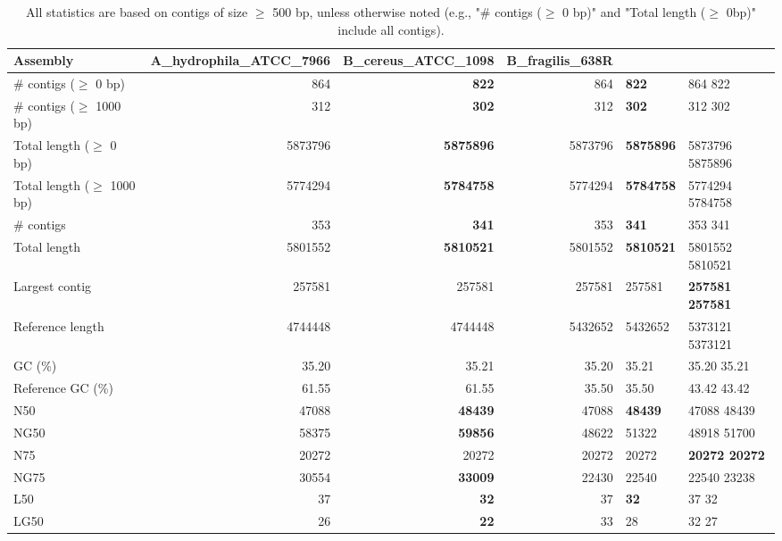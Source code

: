 \documentclass[12pt,a4paper]{article}
\begin{document}
\begin{table}[ht]
\begin{center}
\caption{All statistics are based on contigs of size $\geq$ 500 bp, unless otherwise noted (e.g., "\# contigs ($\geq$ 0 bp)" and "Total length ($\geq$ 0bp)" include all contigs).}
\begin{tabular}{|l*{3}{|r}|}
\hline
Assembly & A\_hydrophila\_ATCC\_7966 & B\_cereus\_ATCC\_1098 & B\_fragilis\_638R \\ \hline
\# contigs ($\geq$ 0 bp) & 864 & {\bf 822} & 864 & {\bf 822} & 864                     822 \\ \hline
\# contigs ($\geq$ 1000 bp) & 312 & {\bf 302} & 312 & {\bf 302} & 312                     302 \\ \hline
Total length ($\geq$ 0 bp) & 5873796 & {\bf 5875896} & 5873796 & {\bf 5875896} & 5873796                 5875896 \\ \hline
Total length ($\geq$ 1000 bp) & 5774294 & {\bf 5784758} & 5774294 & {\bf 5784758} & 5774294                 5784758 \\ \hline
\# contigs & 353 & {\bf 341} & 353 & {\bf 341} & 353                     341 \\ \hline
Total length & 5801552 & {\bf 5810521} & 5801552 & {\bf 5810521} & 5801552                 5810521 \\ \hline
Largest contig & 257581 & 257581 & 257581 & 257581 & {\bf 257581                  257581} \\ \hline
Reference length & 4744448 & 4744448 & 5432652 & 5432652 & 5373121                 5373121 \\ \hline
GC (\%) & 35.20 & 35.21 & 35.20 & 35.21 & 35.20                   35.21 \\ \hline
Reference GC (\%) & 61.55 & 61.55 & 35.50 & 35.50 & 43.42                   43.42 \\ \hline
N50 & 47088 & {\bf 48439} & 47088 & {\bf 48439} & 47088                   48439 \\ \hline
NG50 & 58375 & {\bf 59856} & 48622 & 51322 & 48918                   51700 \\ \hline
N75 & 20272 & 20272 & 20272 & 20272 & {\bf 20272                   20272} \\ \hline
NG75 & 30554 & {\bf 33009} & 22430 & 22540 & 22540                   23238 \\ \hline
L50 & 37 & {\bf 32} & 37 & {\bf 32} & 37                      32 \\ \hline
LG50 & 26 & {\bf 22} & 33 & 28 & 32                      27 \\ \hline

\end{tabular}
\end{center}
\end{table}
\end{document}
